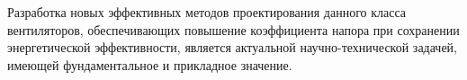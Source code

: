 Разработка новых эффективных методов проектирования данного класса вентиляторов, обеспечивающих повышение коэффициента напора при сохранении энергетической эффективности, является актуальной научно-технической задачей, имеющей фундаментальное и прикладное значение.
{\progress}

